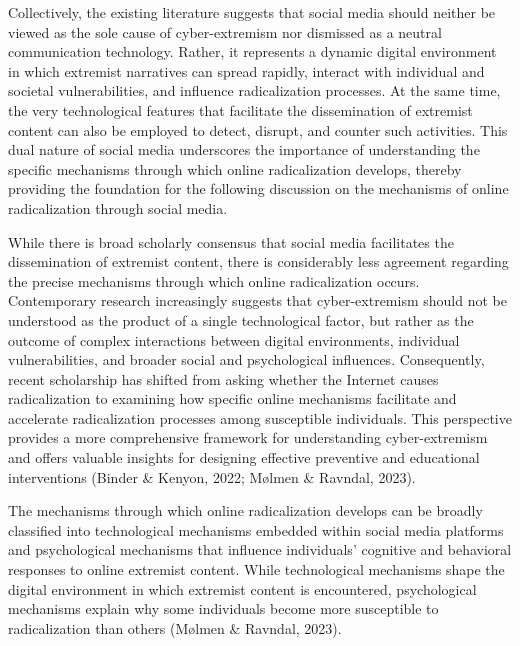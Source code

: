 \documentclass[10pt]{NSP1}
\begin{document}
Collectively, the existing literature suggests that social media should neither be viewed as the sole cause of cyber-extremism nor dismissed as a neutral communication technology. Rather, it represents a dynamic digital environment in which extremist narratives can spread rapidly, interact with individual and societal vulnerabilities, and influence radicalization processes. At the same time, the very technological features that facilitate the dissemination of extremist content can also be employed to detect, disrupt, and counter such activities. This dual nature of social media underscores the importance of understanding the specific mechanisms through which online radicalization develops, thereby providing the foundation for the following discussion on the mechanisms of online radicalization through social media.

\par\medskip{}\smallskip

While there is broad scholarly consensus that social media facilitates the dissemination of extremist content, there is considerably less agreement regarding the precise mechanisms through which online radicalization occurs. Contemporary research increasingly suggests that cyber-extremism should not be understood as the product of a single technological factor, but rather as the outcome of complex interactions between digital environments, individual vulnerabilities, and broader social and psychological influences. Consequently, recent scholarship has shifted from asking whether the Internet causes radicalization to examining how specific online mechanisms facilitate and accelerate radicalization processes among susceptible individuals. This perspective provides a more comprehensive framework for understanding cyber-extremism and offers valuable insights for designing effective preventive and educational interventions (Binder \& Kenyon, 2022; Mølmen \& Ravndal, 2023).

The mechanisms through which online radicalization develops can be broadly classified into technological mechanisms embedded within social media platforms and psychological mechanisms that influence individuals' cognitive and behavioral responses to online extremist content. While technological mechanisms shape the digital environment in which extremist content is encountered, psychological mechanisms explain why some individuals become more susceptible to radicalization than others (Mølmen \& Ravndal, 2023).
\end{document}
